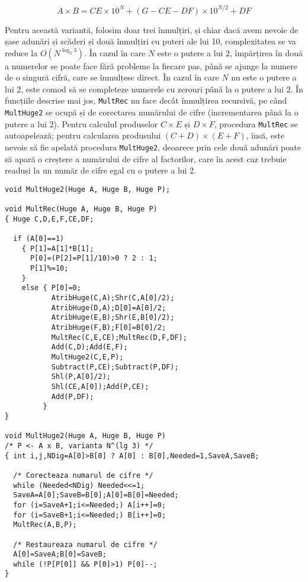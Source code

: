 \begin{equation}
  A \times B = CE \times 10^{N} + (G - CE - DF) \times 10^{N / 2} + DF
\end{equation}
	
Pentru această variantă, folosim doar trei înmulțiri, și chiar dacă avem
nevoie de șase adunări și scăderi și două înmulțiri cu puteri ale lui 10,
complexitatea se va reduce la $O(N^{\log_2 3})$. În cazul în care $N$ este o
putere a lui 2, împărțirea în două a numerelor se poate face fără probleme la
fiecare pas, până se ajunge la numere de o singură cifră, care se înmulțesc
direct. În cazul în care $N$ nu este o putere a lui 2, este comod să se
completeze numerele cu zerouri până la o putere a lui 2. În funcțiile descrise
mai jos, {\tt MultRec} nu face decât înmulțirea recursivă, pe când {\tt
  MultHuge2} se ocupă și de corectarea numărului de cifre (incrementarea până
la o putere a lui 2). Pentru calculul produselor $C \times E$ și $D \times F$,
procedura {\tt MultRec} se autoapelează; pentru calcularea produsului $(C+D)
\times (E+F)$, însă, este nevoie să fie apelată procedura {\tt MultHuge2},
deoarece prin cele două adunări poate să apară o creștere a numărului de cifre
al factorilor, care în acest caz trebuie readuși la un număr de cifre egal cu
o putere a lui 2.

\begin{verbatim}
void MultHuge2(Huge A, Huge B, Huge P);

void MultRec(Huge A, Huge B, Huge P)
{ Huge C,D,E,F,CE,DF;

  if (A[0]==1)
    { P[1]=A[1]*B[1];
      P[0]=(P[2]=P[1]/10)>0 ? 2 : 1;
      P[1]%=10;
    }
    else { P[0]=0;
           AtribHuge(C,A);Shr(C,A[0]/2);
           AtribHuge(D,A);D[0]=A[0]/2;
           AtribHuge(E,B);Shr(E,B[0]/2);
           AtribHuge(F,B);F[0]=B[0]/2;
           MultRec(C,E,CE);MultRec(D,F,DF);
           Add(C,D);Add(E,F);
           MultHuge2(C,E,P);
           Subtract(P,CE);Subtract(P,DF);
           Shl(P,A[0]/2);
           Shl(CE,A[0]);Add(P,CE);
           Add(P,DF);
         }
}

void MultHuge2(Huge A, Huge B, Huge P)
/* P <- A x B, varianta N^(lg 3) */
{ int i,j,NDig=A[0]>B[0] ? A[0] : B[0],Needed=1,SaveA,SaveB;

  /* Corecteaza numarul de cifre */
  while (Needed<NDig) Needed<<=1;
  SaveA=A[0];SaveB=B[0];A[0]=B[0]=Needed;
  for (i=SaveA+1;i<=Needed;) A[i++]=0;
  for (i=SaveB+1;i<=Needed;) B[i++]=0;
  MultRec(A,B,P);

  /* Restaureaza numarul de cifre */
  A[0]=SaveA;B[0]=SaveB;
  while (!P[P[0]] && P[0]>1) P[0]--;
}
\end{verbatim}

